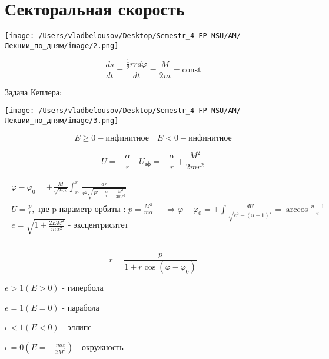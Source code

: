 \documentclass[12pt, a4paper]{report}
\begin{document}
\section{Секторальная скорость}

\begin{center}
    \texttt{[image: /Users/vladbelousov/Desktop/Semestr\_4-FP-NSU/АМ/Лекции\_по\_дням/image/2.png]}
\end{center}

    \[ \frac{ds }{dt}  = \frac{\frac{1}{2} r r d \varphi }{dt} = \frac{M}{2m} = \mathrm{const}               \] 

Задача Кеплера: 

\begin{center}
    \texttt{[image: /Users/vladbelousov/Desktop/Semestr\_4-FP-NSU/АМ/Лекции\_по\_дням/image/3.png]}
\end{center}

    \[ E \geq 0 - \text{инфинитное}  \quad  E < 0 - \text{инфинитное}  \] 

\[ U = -\frac{\alpha}{r} \quad  U _{\text{эф} } = - \frac{\alpha}{r} + \frac{M ^2 }{2 mr ^2 }    \] 

\[ \begin{aligned}
    \begin{array}{l}
        \displaystyle \varphi - \varphi_0 = \pm  \frac{M}{\sqrt{2m}} \int_{ r_0}^{r}  \frac{dr}{ r ^2 \sqrt{E + \frac{\alpha}{ r} - \frac{M ^2 }{2mr ^2 }  }} \\
        U = \frac{p}{ r}, \text{ где p параметр орбиты : }   p = \frac{M ^2 }{m \alpha} \\
        e = \sqrt{ 1 + \frac{2E M ^2 }{m \alpha ^2} } \text{ - эксцентриситет} \\
    \end{array}
    \quad  \Rightarrow \varphi - \varphi_0 = \pm  \int  \frac{dU}{\sqrt{ e ^2 - ( u -1 ) ^2 }}= \arccos {\frac{u-1}{e} } \\ 
\end{aligned}  \] 

\begin{center}
    \[ r= \frac{p}{1 + r \cos  ( \varphi - \varphi_0)} \] 

\( e>1 ( E >0) \) - гипербола 

\( e=1  ( E=0) \) - парабола

\( e<1 ( E<0) \) - эллипс 

\( e = 0 ( E = - \frac{m\alpha} {2 M ^2} ) \) - окружность
\end{center}



\ifdefined\mainfile
\else
    
\end{document}
